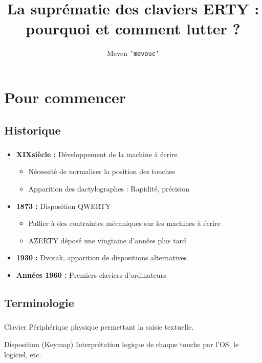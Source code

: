 \documentclass[c,12pt]{beamer}
\title{La suprématie des claviers ERTY : pourquoi et comment lutter ?}
\author{Meven \texttt{'mevouc'} \bsc{Courouble}}
\date{\oldstylenums{3 décembre 2015}}
\begin{document}
\frame{\titlepage}

\section{Pour commencer}
\subsection{Historique}

\begin{frame}
	\frametitle{\subsecname}
	\begin{itemize}
		\item<1-> \textbf{XIX\ieme siècle :} Développement de la machine à écrire
			\begin{itemize}
				\item<2-> Nécessité de normaliser la position des touches
				\item<3-> Apparition des dactylographes : Rapidité, précision
			\end{itemize}
		\item<4-> \textbf{1873 :} Disposition QWERTY
			\begin{itemize}
				\item<5-> Pallier à des contraintes mécaniques sur les machines à écrire
				\item<6-> AZERTY déposé une vingtaine d'années plus tard
			\end{itemize}
		\item<7-> \textbf{1930 :} Dvorak, apparition de dispositions alternatives
		\item \textbf{Années 1960 :} Premiers claviers d'ordinateurs
	\end{itemize}
\end{frame}

\subsection{Terminologie}

\begin{frame}
	\frametitle{\subsecname}
	\begin{block}{Clavier}
		Périphérique physique permettant la saisie textuelle.
	\end{block}
	\begin{block}{Disposition (Keymap)}
		Interprétation logique de chaque touche par l'OS, le logiciel, etc.
	\end{block}
\end{frame}
\end{document}
